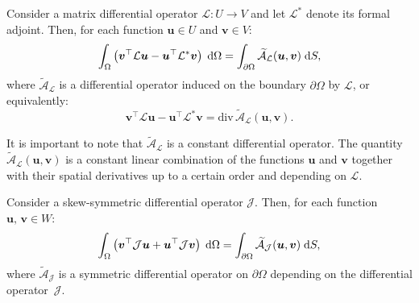 \begin{theorem}\label{th:rogers}
	Consider a matrix differential operator $\mathcal{L} : U \rightarrow V$ and let $\mathcal{L}^*$ denote its formal adjoint. Then, for each function $\bm{u} \in {U}$ and $\bm{v} \in {V}$:
	\begin{equation}
	\int_{\Omega} \left( \bm{v}^\top \mathcal{L} \bm{u} - \bm{u}^\top \mathcal{L}^* \bm{v}\right) \d\Omega= \int_{\partial \Omega} \widetilde{\mathcal{A}}_{\mathcal{L}}(\bm{u}, \bm{v}) \d{S},
	\end{equation}
	where $\widetilde{\mathcal{A}}_{\mathcal{L}}$ is a differential operator induced on the boundary $\partial\Omega$ by $\mathcal{L}$, or equivalently:
	\begin{equation}
	\bm{v}^\top \mathcal{L} \bm{u} - \bm{u}^\top \mathcal{L}^* \bm{v} = \mathrm{div} \, \widetilde{\mathcal{A}}_{\mathcal{L}}(\bm{u}, \bm{v}).
	\end{equation}
\end{theorem}
It is important to note that $\widetilde{\mathcal{A}}_{\mathcal{L}}$ is a constant differential operator. The quantity $\widetilde{\mathcal{A}}_{\mathcal{L}}(\bm{u}, \bm{v})$ is a constant linear combination of the functions $\bm{u}$ and $\bm{v}$ together with their spatial derivatives up to a certain order and depending on $\mathcal{L}$. 

\begin{corollary} 
		Consider a skew-symmetric differential operator $\mathcal{J}$. Then, for each function $\bm{u}, \, \bm{v} \in W$:
	\begin{equation}
	\int_{\Omega} \left( \bm{v}^\top \mathcal{J} \bm{u} + \bm{u}^\top \mathcal{J} \bm{v}\right) \d\Omega= \int_{\partial \Omega} \widetilde{\mathcal{A}}_{\mathcal{J}}(\bm{u}, \bm{v}) \d{S},
	\end{equation}
	where $\widetilde{\mathcal{A}}_{\mathcal{J}}$ is a symmetric differential operator on $\partial\Omega$ depending on the differential operator~$\mathcal{J}$.
\end{corollary}


